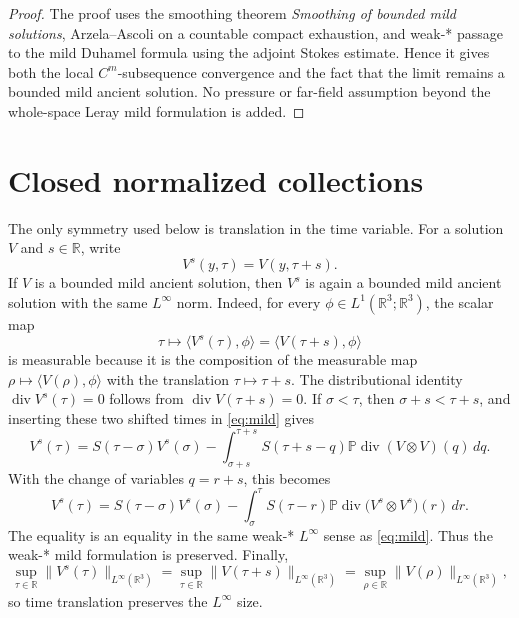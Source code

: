 \documentclass[11pt]{amsart}
\theoremstyle{plain}
\theoremstyle{definition}
\theoremstyle{remark}
\numberwithin{equation}{section}
\begin{document}
\begin{proof}
The proof uses the smoothing theorem \emph{Smoothing of bounded mild
solutions}, Arzela--Ascoli on a countable compact exhaustion, and weak-* passage
to the mild Duhamel formula using the adjoint Stokes estimate.  Hence it gives both
the local \(C^m\)-subsequence convergence and the fact that the limit remains
a bounded mild ancient solution.  No pressure or far-field assumption beyond
the whole-space Leray mild formulation is added.
\end{proof}

\section{Closed normalized collections}

The only symmetry used below is translation in the time variable.  For a
solution \(V\) and \(s\in\mathbb R\), write
\[
   V^{s}(y,\tau)=V(y,\tau+s).
\]
If \(V\) is a bounded mild ancient solution, then \(V^s\) is again a bounded
mild ancient solution with the same \(L^\infty\) norm.  Indeed, for every
\(\phi\in L^1(\mathbb R^3;\mathbb R^3)\), the scalar map
\[
   \tau\mapsto \langle V^s(\tau),\phi\rangle
   =
   \langle V(\tau+s),\phi\rangle
\]
is measurable because it is the composition of the measurable map
\(\rho\mapsto\langle V(\rho),\phi\rangle\) with the translation
\(\tau\mapsto\tau+s\).  The distributional identity
\(\operatorname{div}V^s(\tau)=0\) follows from
\(\operatorname{div}V(\tau+s)=0\).  If \(\sigma<\tau\), then
\(\sigma+s<\tau+s\), and inserting these two shifted times in
\eqref{eq:mild} gives
\[
   V^s(\tau)
   =
   S(\tau-\sigma)V^s(\sigma)
   -
   \int_{\sigma+s}^{\tau+s}
   S(\tau+s-q)\mathbb P\operatorname{div}
      (V\otimes V)(q)\,dq .
\]
With the change of variables \(q=r+s\), this becomes
\[
   V^s(\tau)
   =
   S(\tau-\sigma)V^s(\sigma)
   -
   \int_{\sigma}^{\tau}
   S(\tau-r)\mathbb P\operatorname{div}
      \bigl(V^s\otimes V^s\bigr)(r)\,dr .
\]
The equality is an equality in the same weak-* \(L^\infty\) sense as
\eqref{eq:mild}.  Thus the weak-* mild formulation is preserved.  Finally,
\[
   \sup_{\tau\in\mathbb R}\|V^s(\tau)\|_{L^\infty(\mathbb R^3)}
   =
   \sup_{\tau\in\mathbb R}\|V(\tau+s)\|_{L^\infty(\mathbb R^3)}
   =
   \sup_{\rho\in\mathbb R}\|V(\rho)\|_{L^\infty(\mathbb R^3)},
\]
so time translation preserves the \(L^\infty\) size.
\end{document}
